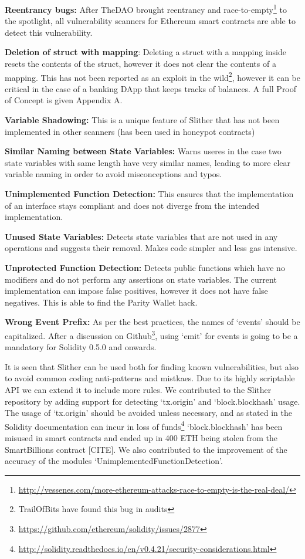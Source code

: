 \textbf{Reentrancy bugs:} After TheDAO brought reentrancy and race-to-empty\footnote{\url{http://vessenes.com/more-ethereum-attacks-race-to-empty-is-the-real-deal/}} to the spotlight, all vulnerability scanners for Ethereum smart contracts are able to detect this vulnerability.

\textbf{Deletion of struct with mapping}: Deleting a struct with a mapping inside resets the contents of the struct, however it does not clear the contents of a mapping. This has not been reported as an exploit in the wild\footnote{TrailOfBits have found this bug in audits}, however it can be critical in the case of a banking DApp that keeps tracks of balances. A full Proof of Concept is given Appendix A.

\textbf{Variable Shadowing:} This is a unique feature of Slither that has not been implemented in other scanners (has been used in honeypot contracts)

\textbf{Similar Naming between State Variables:} Warns useres in the case two state variables with same length have very similar names, leading to more clear variable naming in order to avoid misconceptions and typos.

\textbf{Unimplemented Function Detection:} This ensures that the implementation of an interface stays compliant and does not diverge from the intended implementation.

\textbf{Unused State Variables:} Detects state variables that are not used in any operations and suggests their removal. Makes code simpler and less gas intensive.

\textbf{Unprotected Function Detection:} Detects public functions which have no modifiers and do not perform any assertions on state variables. The current implementation can impose false positives, however it does not have false negatives. This is able to find the Parity Wallet hack.

\textbf{Wrong Event Prefix:} As per the best practices, the names of `events' should be capitalized. After a discussion on Github\footnote{\url{https://github.com/ethereum/solidity/issues/2877}}, using `emit' for events is going to be a mandatory for Solidity 0.5.0 and onwards.


It is seen that Slither can be used both for finding known vulnerabilities, but also to avoid common coding anti-patterns and mistkaes. Due to its highly scriptable API we can extend it to include more rules. We contributed to the Slither repository by adding support for detecting `tx.origin' and `block.blockhash' usage. The usage of `tx.origin' should be avoided unless necessary, and as stated in the Solidity documentation can incur in loss of funds\footnote{\url{http://solidity.readthedocs.io/en/v0.4.21/security-considerations.html}} `block.blockhash' has been misused in smart contracts and ended up in 400 ETH being stolen from the SmartBillions contract [CITE]. We also contributed to the improvement of the accuracy of the modules `UnimplementedFunctionDetection'.



